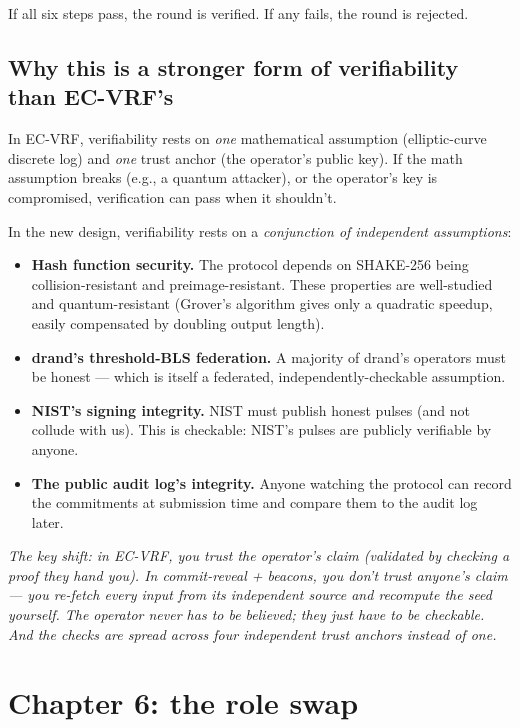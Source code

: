 \documentclass[11pt]{article}
\newenvironment{aside}{\par\medskip\noindent\itshape\small\color{black!70}}{\normalfont\par\medskip}
\begin{document}
If all six steps pass, the round is verified. If any fails, the round is rejected.

\subsection*{Why this is a stronger form of verifiability than EC-VRF's}

In EC-VRF, verifiability rests on \emph{one} mathematical assumption (elliptic-curve discrete log) and \emph{one} trust anchor (the operator's public key). If the math assumption breaks (e.g., a quantum attacker), or the operator's key is compromised, verification can pass when it shouldn't.

In the new design, verifiability rests on a \emph{conjunction of independent assumptions}:

\begin{itemize}[leftmargin=2em, itemsep=2pt]
\item \textbf{Hash function security.} The protocol depends on SHAKE-256 being collision-resistant and preimage-resistant. These properties are well-studied and quantum-resistant (Grover's algorithm gives only a quadratic speedup, easily compensated by doubling output length).
\item \textbf{drand's threshold-BLS federation.} A majority of drand's operators must be honest --- which is itself a federated, independently-checkable assumption.
\item \textbf{NIST's signing integrity.} NIST must publish honest pulses (and not collude with us). This is checkable: NIST's pulses are publicly verifiable by anyone.
\item \textbf{The public audit log's integrity.} Anyone watching the protocol can record the commitments at submission time and compare them to the audit log later.
\end{itemize}

\begin{aside}
The key shift: in EC-VRF, you trust the operator's claim (validated by checking a proof they hand you). In commit-reveal + beacons, you don't trust anyone's claim --- you \emph{re-fetch every input from its independent source} and \emph{recompute} the seed yourself. The operator never has to be believed; they just have to be checkable. And the checks are spread across four independent trust anchors instead of one.
\end{aside}

\section{Chapter 6: the role swap}
\end{document}
